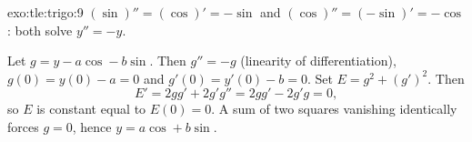 \begin{solution}{exo:tle:trigo:9}
$(\sin)'' = (\cos)' = -\sin$ and $(\cos)'' = (-\sin)' = -\cos$: both solve
$y'' = -y$.

Let $g = y - a\cos - b\sin$. Then $g'' = -g$ (linearity of differentiation),
$g(0) = y(0) - a = 0$ and $g'(0) = y'(0) - b = 0$. Set
$E = g^2 + (g')^2$. Then
\[
E' = 2g g' + 2g' g'' = 2g g' - 2g' g = 0,
\]
so $E$ is constant equal to $E(0) = 0$. A sum of two squares vanishing
identically forces $g = 0$, hence $y = a\cos + b\sin$.
\end{solution}
